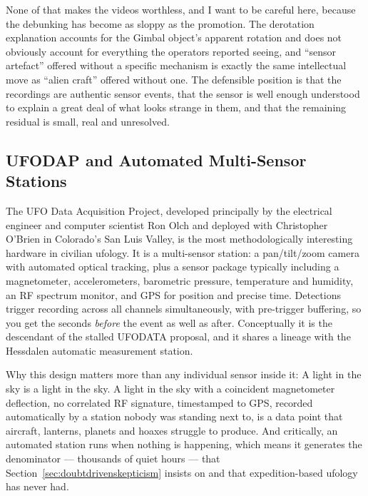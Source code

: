 None of that makes the videos worthless, and I want to be careful here, because the debunking
has become as sloppy as the promotion. The derotation explanation accounts for the Gimbal
object's apparent rotation and does not obviously account for everything the operators reported
seeing, and ``sensor artefact'' offered without a specific mechanism is exactly the same
intellectual move as ``alien craft'' offered without one. The defensible position is that the
recordings are authentic sensor events, that the sensor is well enough understood to explain a
great deal of what looks strange in them, and that the remaining residual is small, real and
unresolved.

\Needspace*{0.40\textheight}
\subsection{UFODAP and Automated Multi-Sensor Stations}\label{sec:ufodapautomatedmultise}

The UFO Data Acquisition Project, developed principally by the electrical engineer and computer
scientist Ron Olch and deployed with Christopher O'Brien in Colorado's San Luis Valley, is the
most methodologically interesting hardware in civilian ufology. It is a multi-sensor station: a
pan/tilt/zoom camera with automated optical tracking, plus a sensor package typically including
a magnetometer, accelerometers, barometric pressure, temperature and humidity, an RF spectrum
monitor, and GPS for position and precise time. Detections trigger recording across all channels
simultaneously, with pre-trigger buffering, so you get the seconds \emph{before} the event as
well as after. Conceptually it is the descendant of the stalled UFODATA proposal, and it shares
a lineage with the Hessdalen automatic measurement station.

Why this design matters more than any individual sensor inside it:  A light in the sky is a light in the sky. A light in the sky with a coincident
magnetometer deflection, no correlated RF signature, timestamped to GPS, recorded automatically
by a station nobody was standing next to, is a data point that aircraft, lanterns, planets and
hoaxes struggle to produce. And critically, an automated station runs when nothing is happening,
which means it generates the denominator --- thousands of quiet hours --- that Section~\ref{sec:doubtdrivenskepticism}
insists on and that expedition-based ufology has never had.

